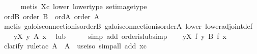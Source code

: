 \begin{isabellebody}
\ \ \ \ \isamarkupfalse%
\ {}metis\ Xc\ lower\ lower{}type\ set{}image{}type{}\isanewline
\isanewline
\ \ \isamarkupfalse%
\ ord{}B{}\ {}order\ B{}\ \ ord{}A{}\ {}order\ A{}\isanewline
\ \ \ \ \isamarkupfalse%
\ {}metis\ galois{}connection{}is{}order{}B\ galois{}connection{}is{}order{}A\ lower\ lower{}adjoint{}def{}{}\isanewline
\isanewline
\ \ \isamarkupfalse%
\ {}{}y{}X{}\ y\ {}\isactrlbsub A\isactrlesub \ x{}\ \isamarkupfalse%
\ lub\isanewline
\ \ \ \ \isamarkupfalse%
\ {}simp\ add{}\ order{}is{}lub{}simp{}\isanewline
\isanewline
\ \ \isamarkupfalse%
\ {}{}y{}X{}\ f\ y\ {}\isactrlbsub B\isactrlesub \ f\ x{}\isanewline
\ \ \ \ \isamarkupfalse%
\ {}clarify{}\ rule{}tac\ {}A\ {}\ A\ \ use{}iso{}{}\ simp{}all\ add{}\ xc{}\isanewline

\end{isabellebody}
